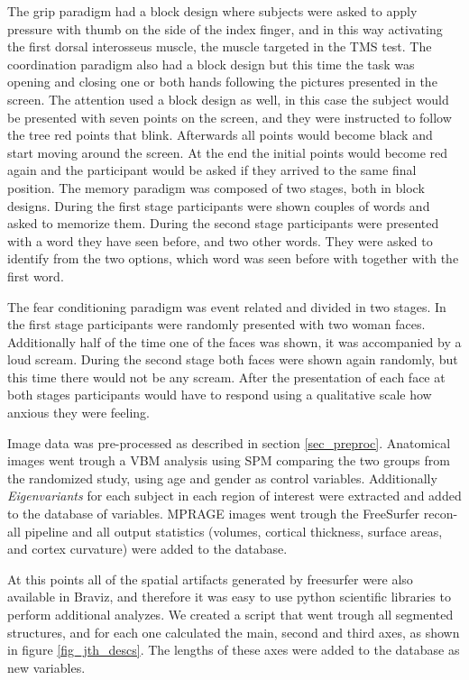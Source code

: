 The grip paradigm had a block design where subjects were asked to apply pressure with thumb on the side of the index finger, and in this way activating the first dorsal interosseus muscle, the muscle targeted in the TMS test. The coordination paradigm also had a block design but this time the task was opening and closing one or both hands following the pictures presented in the screen. The attention used a block design as well, in this case the subject would be presented with seven points on the screen, and they were instructed to follow the tree red points that blink. Afterwards all points would become black and start moving around the screen. At the end the initial points would become red again and the participant would be asked if they arrived to the same final position. 
The memory paradigm was composed of two stages, both in block designs. During the first stage participants were shown couples of words and asked to memorize them. During the second stage participants were presented with a word they have seen before, and two other words. They were asked to identify from the two options, which word was seen before with together with the first word.


The fear conditioning paradigm was event related and divided in two stages. In the first stage participants were randomly presented with two woman faces. Additionally half of the time one of the faces was shown, it was accompanied by a loud scream.  During the second stage  both faces were shown again randomly, but this time there would not be any scream. After the presentation of each face at both stages participants would have to respond using a qualitative scale how anxious they were feeling.
\smallskip

Image data was pre-processed as described in section \ref{sec_preproc}. Anatomical images went trough a VBM analysis using SPM comparing the two groups from the randomized study, using age and gender as control variables. Additionally \emph{Eigenvariants} for each subject in each region of interest were extracted and added to the database of variables. MPRAGE images went trough the FreeSurfer recon-all pipeline and all output statistics (volumes, cortical thickness, surface areas, and cortex curvature) were added to the database. 

At this points all of the spatial artifacts generated by freesurfer were also available in Braviz, and therefore it was easy to use python scientific libraries to perform additional analyzes. We created a script that went trough all segmented structures, and for each one calculated the main, second and third axes, as shown in figure \ref{fig_jth_descs}. The lengths of these axes were added to the database as new variables.

